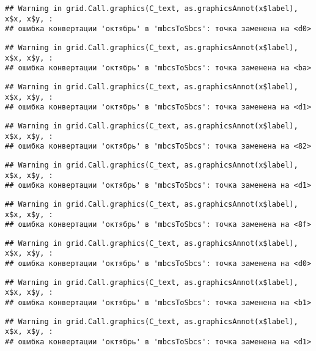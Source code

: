 \documentclass[
]{article}
\begin{document}
\begin{verbatim}
## Warning in grid.Call.graphics(C_text, as.graphicsAnnot(x$label), x$x, x$y, :
## ошибка конвертации 'октябрь' в 'mbcsToSbcs': точка заменена на <d0>
\end{verbatim}

\begin{verbatim}
## Warning in grid.Call.graphics(C_text, as.graphicsAnnot(x$label), x$x, x$y, :
## ошибка конвертации 'октябрь' в 'mbcsToSbcs': точка заменена на <ba>
\end{verbatim}

\begin{verbatim}
## Warning in grid.Call.graphics(C_text, as.graphicsAnnot(x$label), x$x, x$y, :
## ошибка конвертации 'октябрь' в 'mbcsToSbcs': точка заменена на <d1>
\end{verbatim}

\begin{verbatim}
## Warning in grid.Call.graphics(C_text, as.graphicsAnnot(x$label), x$x, x$y, :
## ошибка конвертации 'октябрь' в 'mbcsToSbcs': точка заменена на <82>
\end{verbatim}

\begin{verbatim}
## Warning in grid.Call.graphics(C_text, as.graphicsAnnot(x$label), x$x, x$y, :
## ошибка конвертации 'октябрь' в 'mbcsToSbcs': точка заменена на <d1>
\end{verbatim}

\begin{verbatim}
## Warning in grid.Call.graphics(C_text, as.graphicsAnnot(x$label), x$x, x$y, :
## ошибка конвертации 'октябрь' в 'mbcsToSbcs': точка заменена на <8f>
\end{verbatim}

\begin{verbatim}
## Warning in grid.Call.graphics(C_text, as.graphicsAnnot(x$label), x$x, x$y, :
## ошибка конвертации 'октябрь' в 'mbcsToSbcs': точка заменена на <d0>
\end{verbatim}

\begin{verbatim}
## Warning in grid.Call.graphics(C_text, as.graphicsAnnot(x$label), x$x, x$y, :
## ошибка конвертации 'октябрь' в 'mbcsToSbcs': точка заменена на <b1>
\end{verbatim}

\begin{verbatim}
## Warning in grid.Call.graphics(C_text, as.graphicsAnnot(x$label), x$x, x$y, :
## ошибка конвертации 'октябрь' в 'mbcsToSbcs': точка заменена на <d1>
\end{verbatim}
\end{document}
